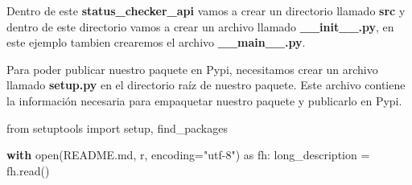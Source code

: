 \documentclass[
  a4paper,
  DIV=11,
  numbers=noendperiod,
  onepage,
  openany]{scrreprt}
\newenvironment{Shaded}{\begin{snugshade}}{\end{snugshade}}
\newcommand{\BuiltInTok}[1]{\textcolor[rgb]{0.00,0.23,0.31}{#1}}
\newcommand{\ControlFlowTok}[1]{\textcolor[rgb]{0.00,0.23,0.31}{\textbf{#1}}}
\newcommand{\ImportTok}[1]{\textcolor[rgb]{0.00,0.46,0.62}{#1}}
\newcommand{\NormalTok}[1]{\textcolor[rgb]{0.00,0.23,0.31}{#1}}
\newcommand{\OperatorTok}[1]{\textcolor[rgb]{0.37,0.37,0.37}{#1}}
\newcommand{\StringTok}[1]{\textcolor[rgb]{0.13,0.47,0.30}{#1}}
\begin{document}
\begin{tcolorbox}
Dentro de este \textbf{status\_checker\_api} vamos a crear un directorio
llamado \textbf{src} y dentro de este directorio vamos a crear un
archivo llamado \textbf{\_\_init\_\_.py}, en este ejemplo tambien
crearemos el archivo \textbf{\_\_main\_\_.py}.

Para poder publicar nuestro paquete en Pypi, necesitamos crear un
archivo llamado \textbf{setup.py} en el directorio raíz de nuestro
paquete. Este archivo contiene la información necesaria para empaquetar
nuestro paquete y publicarlo en Pypi.

\begin{Shaded}
\begin{Highlighting}[]
\ImportTok{from}\NormalTok{ setuptools }\ImportTok{import}\NormalTok{ setup, find\_packages}

\ControlFlowTok{with} \BuiltInTok{open}\NormalTok{(}\StringTok{\textquotesingle{}README.md\textquotesingle{}}\NormalTok{, }\StringTok{\textquotesingle{}r\textquotesingle{}}\NormalTok{, encoding}\OperatorTok{=}\StringTok{"utf{-}8"}\NormalTok{) }\ImportTok{as}\NormalTok{ fh:}
\NormalTok{    long\_description }\OperatorTok{=}\NormalTok{ fh.read()}


\end{Highlighting}
\end{Shaded}
\end{tcolorbox}
\end{document}
